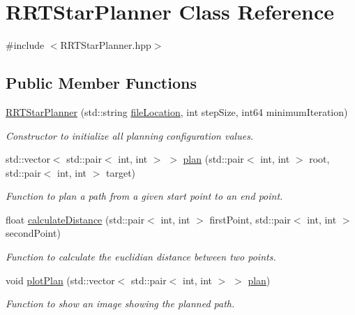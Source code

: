 \hypertarget{classRRTStarPlanner}{}\section{R\+R\+T\+Star\+Planner Class Reference}
\label{classRRTStarPlanner}


{\ttfamily \#include $<$R\+R\+T\+Star\+Planner.\+hpp$>$}

\subsection*{Public Member Functions}
\begin{DoxyCompactItemize}
\item 
\hyperlink{classRRTStarPlanner_a6150c4b8e58701085b7d51874b286e1b}{R\+R\+T\+Star\+Planner} (std\+::string \hyperlink{test_8cpp_a73740b243e97be1a2520548c12cc10b6}{file\+Location}, int step\+Size, int64 minimum\+Iteration)
\begin{DoxyCompactList}\small\item\em Constructor to initialize all planning configuration values. \end{DoxyCompactList}\item 
std\+::vector$<$ std\+::pair$<$ int, int $>$ $>$ \hyperlink{classRRTStarPlanner_afee7f772c5ff1372b21da124b9818b23}{plan} (std\+::pair$<$ int, int $>$ root, std\+::pair$<$ int, int $>$ target)
\begin{DoxyCompactList}\small\item\em Function to plan a path from a given start point to an end point. \end{DoxyCompactList}\item 
float \hyperlink{classRRTStarPlanner_adccd56a0d89c7691a6d844452c077242}{calculate\+Distance} (std\+::pair$<$ int, int $>$ first\+Point, std\+::pair$<$ int, int $>$ second\+Point)
\begin{DoxyCompactList}\small\item\em Function to calculate the euclidian distance between two points. \end{DoxyCompactList}\item 
void \hyperlink{classRRTStarPlanner_aae4d76c2a9e87b89cb3731ea49883134}{plot\+Plan} (std\+::vector$<$ std\+::pair$<$ int, int $>$ $>$ \hyperlink{classRRTStarPlanner_afee7f772c5ff1372b21da124b9818b23}{plan})
\begin{DoxyCompactList}\small\item\em Function to show an image showing the planned path. \end{DoxyCompactList}\end{DoxyCompactItemize}



